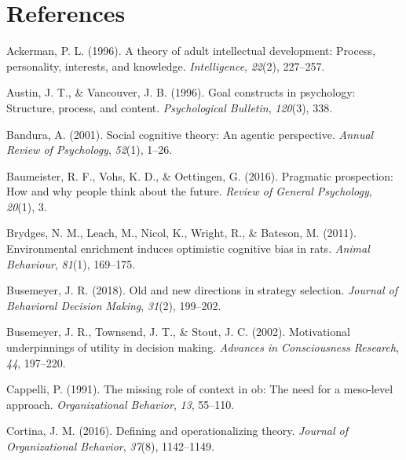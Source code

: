 \documentclass[english,,man]{apa6}
\theoremstyle{definition}
\theoremstyle{definition}
\theoremstyle{definition}
\theoremstyle{remark}
\begin{document}
\newpage

\hypertarget{references}{%
\section{References}\label{references}}

\setlength{\parindent}{-0.5in}
\setlength{\leftskip}{0.5in}

\hypertarget{refs}{}
\leavevmode\hypertarget{ref-ackerman1996}{}%
Ackerman, P. L. (1996). A theory of adult intellectual development:
Process, personality, interests, and knowledge. \emph{Intelligence},
\emph{22}(2), 227--257.

\leavevmode\hypertarget{ref-austin1996}{}%
Austin, J. T., \& Vancouver, J. B. (1996). Goal constructs in
psychology: Structure, process, and content. \emph{Psychological
Bulletin}, \emph{120}(3), 338.

\leavevmode\hypertarget{ref-bandura2001}{}%
Bandura, A. (2001). Social cognitive theory: An agentic perspective.
\emph{Annual Review of Psychology}, \emph{52}(1), 1--26.

\leavevmode\hypertarget{ref-baumeister2016}{}%
Baumeister, R. F., Vohs, K. D., \& Oettingen, G. (2016). Pragmatic
prospection: How and why people think about the future. \emph{Review of
General Psychology}, \emph{20}(1), 3.

\leavevmode\hypertarget{ref-brydges2011}{}%
Brydges, N. M., Leach, M., Nicol, K., Wright, R., \& Bateson, M. (2011).
Environmental enrichment induces optimistic cognitive bias in rats.
\emph{Animal Behaviour}, \emph{81}(1), 169--175.

\leavevmode\hypertarget{ref-busemeyer2018}{}%
Busemeyer, J. R. (2018). Old and new directions in strategy selection.
\emph{Journal of Behavioral Decision Making}, \emph{31}(2), 199--202.

\leavevmode\hypertarget{ref-busemeyer2002}{}%
Busemeyer, J. R., Townsend, J. T., \& Stout, J. C. (2002). Motivational
underpinnings of utility in decision making. \emph{Advances in
Consciousness Research}, \emph{44}, 197--220.

\leavevmode\hypertarget{ref-cappelli1991}{}%
Cappelli, P. (1991). The missing role of context in ob: The need for a
meso-level approach. \emph{Organizational Behavior}, \emph{13}, 55--110.

\leavevmode\hypertarget{ref-Cortina2016}{}%
Cortina, J. M. (2016). Defining and operationalizing theory.
\emph{Journal of Organizational Behavior}, \emph{37}(8), 1142--1149.
\end{document}
